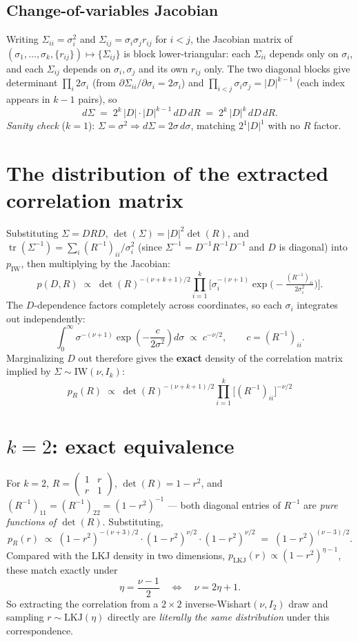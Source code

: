 \documentclass[11pt]{article}
\newcommand{\IW}{\mathrm{IW}}
\newcommand{\LKJ}{\mathrm{LKJ}}
\begin{document}
\subsection*{Change-of-variables Jacobian}

Writing $\Sigma_{ii} = \sigma_i^2$ and $\Sigma_{ij} = \sigma_i \sigma_j r_{ij}$
for $i<j$, the Jacobian matrix of $(\sigma_1,\dots,\sigma_k, \{r_{ij}\}) \mapsto
\{\Sigma_{ij}\}$ is block lower-triangular: each $\Sigma_{ii}$ depends only on
$\sigma_i$, and each $\Sigma_{ij}$ depends on $\sigma_i,\sigma_j$ and its own
$r_{ij}$ only. The two diagonal blocks give determinant $\prod_i 2\sigma_i$
(from $\partial \Sigma_{ii}/\partial \sigma_i = 2\sigma_i$) and
$\prod_{i<j}\sigma_i\sigma_j = |D|^{k-1}$ (each index appears in $k-1$ pairs),
so
\[
  d\Sigma \;=\; 2^k\,|D|\cdot|D|^{k-1}\, dD\, dR \;=\; 2^k\,|D|^{k}\, dD\, dR.
\]
\emph{Sanity check} ($k=1$): $\Sigma=\sigma^2 \Rightarrow d\Sigma = 2\sigma\,d\sigma$,
matching $2^1|D|^1$ with no $R$ factor.

\section*{The distribution of the extracted correlation matrix}

Substituting $\Sigma = DRD$, $\det(\Sigma) = |D|^2\det(R)$, and
$\operatorname{tr}(\Sigma^{-1}) = \sum_i (R^{-1})_{ii}/\sigma_i^2$ (since
$\Sigma^{-1} = D^{-1}R^{-1}D^{-1}$ and $D$ is diagonal) into $p_\IW$, then
multiplying by the Jacobian:
\[
  p(D, R) \;\propto\; \det(R)^{-(\nu+k+1)/2}
  \prod_{i=1}^k \Big[ \sigma_i^{-(\nu+1)} \exp\!\big(-\tfrac{(R^{-1})_{ii}}{2\sigma_i^2}\big) \Big].
\]
The $D$-dependence factors completely across coordinates, so each $\sigma_i$
integrates out independently:
\[
  \int_0^\infty \sigma^{-(\nu+1)} \exp\!\left(-\frac{c}{2\sigma^2}\right) d\sigma
  \;\propto\; c^{-\nu/2}, \qquad c = (R^{-1})_{ii}.
\]
Marginalizing $D$ out therefore gives the \textbf{exact} density of the
correlation matrix implied by $\Sigma \sim \IW(\nu, I_k)$:
\[
  \boxed{\; p_R(R) \;\propto\; \det(R)^{-(\nu+k+1)/2} \prod_{i=1}^k \big[(R^{-1})_{ii}\big]^{-\nu/2} \;}
\]

\section*{$k=2$: exact equivalence}

For $k=2$, $R = \left(\begin{smallmatrix}1 & r \\ r & 1\end{smallmatrix}\right)$,
$\det(R) = 1-r^2$, and $(R^{-1})_{11} = (R^{-1})_{22} = (1-r^2)^{-1}$ --- both
diagonal entries of $R^{-1}$ are \emph{pure functions of $\det(R)$}. Substituting,
\[
  p_R(r) \;\propto\; (1-r^2)^{-(\nu+3)/2} \cdot (1-r^2)^{\nu/2} \cdot (1-r^2)^{\nu/2}
  \;=\; (1-r^2)^{(\nu-3)/2}.
\]
Compared with the LKJ density in two dimensions, $p_{\LKJ}(r) \propto (1-r^2)^{\eta-1}$,
these match exactly under
\[
  \eta = \frac{\nu - 1}{2} \quad\Longleftrightarrow\quad \nu = 2\eta + 1.
\]
So extracting the correlation from a $2\times 2$ inverse-Wishart$(\nu, I_2)$
draw and sampling $r \sim \LKJ(\eta)$ directly are \emph{literally the same
distribution} under this correspondence.
\end{document}

